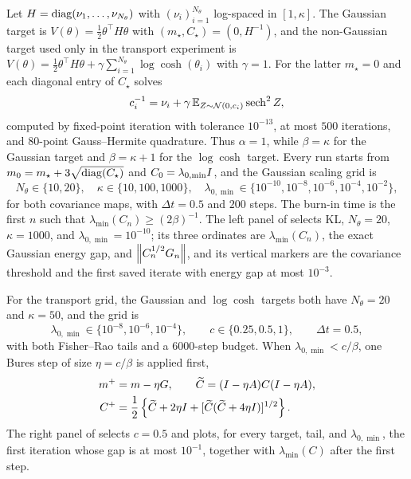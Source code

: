 Let $H = \operatorname{diag}(\nu_1,\ldots,\nu_{N_\theta})$ with
$(\nu_i)_{i=1}^{N_\theta}$ log-spaced in $[1,\kappa]$. The
Gaussian target is $V(\theta) = \frac12\theta^\top H\theta$ with
$(m_\star,C_\star) = (0,H^{-1})$, and the non-Gaussian target used only in the
transport experiment is
$V(\theta) = \frac12\theta^\top H\theta
+ \gamma\sum_{i=1}^{N_\theta}\log\cosh(\theta_i)$ with $\gamma = 1$. For the
latter $m_\star = 0$ and each diagonal entry of $C_\star$ solves
\begin{equation}\label{eq:app-diag-fixed-point}
  c_i^{-1} = \nu_i + \gamma\,\mathbb{E}_{Z\sim\mathcal{N}(0,c_i)}\operatorname{sech}^2Z,
\end{equation}
computed by fixed-point iteration with tolerance $10^{-13}$, at most $500$
iterations, and $80$-point Gauss--Hermite quadrature. Thus $\alpha = 1$, while
$\beta = \kappa$ for the Gaussian target and $\beta = \kappa+1$ for the
$\log\cosh$ target. Every run starts from
$m_0 = m_\star + 3\sqrt{\operatorname{diag}(C_\star)}$ and $C_0 = \lambda_{0,\min}I$, and
the Gaussian scaling grid is
\begin{equation*}
  N_\theta\in\{10,20\},\quad
  \kappa\in\{10,100,1000\},\quad
  \lambda_{0,\min}\in\{10^{-10},10^{-8},10^{-6},10^{-4},10^{-2}\},
\end{equation*}
for both covariance maps, with $\Delta t = 0.5$ and $200$ steps. The burn-in
time is the first $n$ such that $\lambda_{\min}(C_n)\geq(2\beta)^{-1}$. The left
panel of  selects KL, $N_\theta = 20$,
$\kappa = 1000$, and $\lambda_{0,\min} = 10^{-10}$; its three ordinates are
$\lambda_{\min}(C_n)$, the exact Gaussian energy gap, and
$\left\lVert C_n^{1/2}G_n\right\rVert$, and its vertical markers are the covariance threshold
and the first saved iterate with energy gap at most $10^{-3}$.

For the transport grid, the Gaussian and $\log\cosh$ targets both have
$N_\theta = 20$ and $\kappa = 50$, and the grid is
\begin{equation*}
  \lambda_{0,\min}\in\{10^{-8},10^{-6},10^{-4}\},\qquad
  c\in\{0.25,0.5,1\},\qquad \Delta t = 0.5,
\end{equation*}
with both Fisher--Rao tails and a $6000$-step budget. When
$\lambda_{0,\min} < c/\beta$, one Bures step of size $\eta = c/\beta$ is applied
first,
\begin{align*}
  m^+ &= m - \eta G, \qquad \widetilde C = (I-\eta A)C(I-\eta A),\\
  C^+ &= \frac12\left\{\widetilde C + 2\eta I
    + [\widetilde C(\widetilde C+4\eta I)]^{1/2}\right\}.
\end{align*}
The right panel of  selects $c = 0.5$ and plots, for
every target, tail, and $\lambda_{0,\min}$, the first iteration whose gap is at
most $10^{-1}$, together with $\lambda_{\min}(C)$ after the first step.

